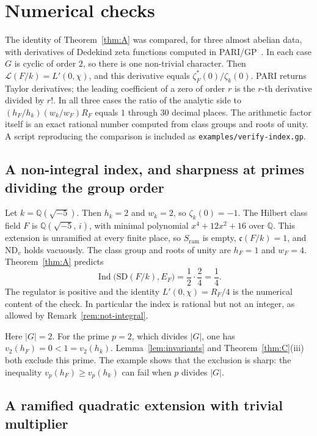 \documentclass[11pt]{article}
\theoremstyle{plain}
\theoremstyle{definition}
\theoremstyle{remark}
\newcommand{\Q}{\mathbb{Q}}
\newcommand{\Ind}{\operatorname{Ind}}
\newcommand{\ram}{\mathrm{ram}}
\newcommand{\SD}{\mathrm{SD}}
\begin{document}
\section{Numerical checks}
\label{sec:examples}

The identity of Theorem~\ref{thm:A} was compared, for three almost abelian data, with derivatives of Dedekind zeta functions computed in PARI/GP~\cite{PARI}.
In each case $G$ is cyclic of order $2$, so there is one non-trivial character.
Then $\mathcal{L}(F/k)=L'(0,\chi)$, and this derivative equals $\zeta_F^{*}(0)/\zeta_k(0)$.
PARI returns Taylor derivatives; the leading coefficient of a zero of order $r$ is the $r$-th derivative divided by $r!$.
In all three cases the ratio of the analytic side to $(h_F/h_k)(w_k/w_F)R_F$ equals $1$ through $30$ decimal places.
The arithmetic factor itself is an exact rational number computed from class groups and roots of unity.
A script reproducing the comparison is included as \texttt{examples/verify-index.gp}.

\subsection{A non-integral index, and sharpness at primes dividing the group order}

Let $k=\Q(\sqrt{-5})$.
Then $h_k=2$ and $w_k=2$, so $\zeta_k(0)=-1$.
The Hilbert class field $F$ is $\Q(\sqrt{-5},\,i)$, with minimal polynomial $x^{4}+12x^{2}+16$ over $\Q$.
This extension is unramified at every finite place, so $S_{\ram}$ is empty, $\mathfrak{c}(F/k)=1$, and $\mathrm{ND}_v$ holds vacuously.
The class group and roots of unity are $h_F=1$ and $w_F=4$.
Theorem~\ref{thm:A} predicts
\[
  \Ind\bigl(\SD(F/k),E_F\bigr)
  =\frac{1}{2}\cdot\frac{2}{4}
  =\frac{1}{4}.
\]
The regulator is positive and the identity $L'(0,\chi)=R_F/4$ is the numerical content of the check.
In particular the index is rational but not an integer, as allowed by Remark~\ref{rem:not-integral}.

Here $|G|=2$.
For the prime $p=2$, which divides $|G|$, one has $v_2(h_F)=0<1=v_2(h_k)$.
Lemma~\ref{lem:invariants} and Theorem~\ref{thm:C}(iii) both exclude this prime.
The example shows that the exclusion is sharp: the inequality $v_p(h_F)\ge v_p(h_k)$ can fail when $p$ divides $|G|$.

\subsection{A ramified quadratic extension with trivial multiplier}
\end{document}
